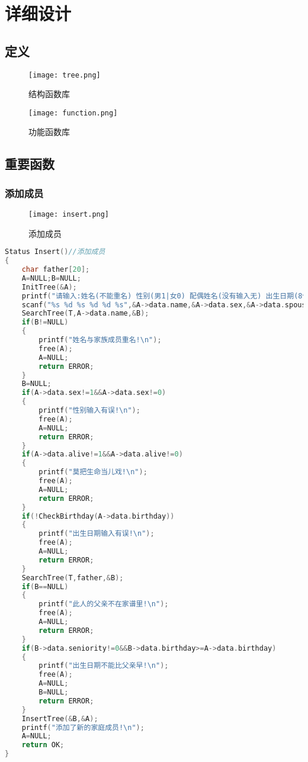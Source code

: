 \documentclass{DateStructure}
\begin{document}
\section{详细设计}
\subsection{定义}
\begin{figure}[H] 
\centering
\texttt{[image: tree.png]}
\caption{结构函数库}
\end{figure}
\begin{figure}[H] 
\centering
\texttt{[image: function.png]}
\caption{功能函数库}
\end{figure}
	
\subsection{重要函数}
\subsubsection{添加成员}
\begin{figure}[H] 
\centering
\texttt{[image: insert.png]}
\caption{添加成员}
\end{figure}
\begin{lstlisting}[language=c,caption={Insert}]
Status Insert()//添加成员
{
    char father[20];
    A=NULL;B=NULL;
    InitTree(&A);
    printf("请输入:姓名(不能重名) 性别(男1|女0) 配偶姓名(没有输入无) 出生日期(8位数) 是否在世(1|0) 父亲姓名\n ");
    scanf("%s %d %s %d %d %s",&A->data.name,&A->data.sex,&A->data.spouse,&A->data.birthday,&A->data.alive,father);
    SearchTree(T,A->data.name,&B);
    if(B!=NULL)
    {
        printf("姓名与家族成员重名!\n");
        free(A);
        A=NULL;
        return ERROR;
    }
    B=NULL;
    if(A->data.sex!=1&&A->data.sex!=0)
    {
        printf("性别输入有误!\n");
        free(A);
        A=NULL;
        return ERROR;
    }
    if(A->data.alive!=1&&A->data.alive!=0)
    {
        printf("莫把生命当儿戏!\n");
        free(A);
        A=NULL;
        return ERROR;
    }
    if(!CheckBirthday(A->data.birthday))
    {
        printf("出生日期输入有误!\n");
        free(A);
        A=NULL;
        return ERROR;
    }
    SearchTree(T,father,&B);
    if(B==NULL)
    {
        printf("此人的父亲不在家谱里!\n");
        free(A);
        A=NULL;
        return ERROR;
    }
    if(B->data.seniority!=0&&B->data.birthday>=A->data.birthday)
    {
        printf("出生日期不能比父亲早!\n");
        free(A);
        A=NULL;
        B=NULL;
        return ERROR;
    }
    InsertTree(&B,&A);
    printf("添加了新的家庭成员!\n");
    A=NULL;
    return OK;
}
\end{lstlisting}
\end{document}
